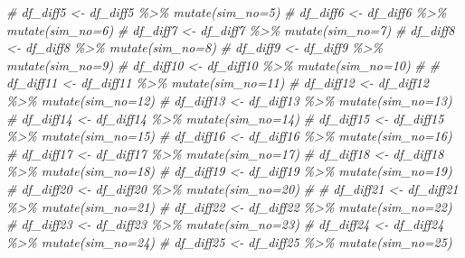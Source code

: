 \documentclass[
]{article}
\newenvironment{Shaded}{\begin{snugshade}}{\end{snugshade}}
\newcommand{\CommentTok}[1]{\textcolor[rgb]{0.56,0.35,0.01}{\textit{#1}}}
\begin{document}
\begin{Shaded}
\begin{Highlighting}[]
\CommentTok{\# df\_diff5 \textless{}{-} df\_diff5 \%\textgreater{}\% mutate(sim\_no=\textquotesingle{}5\textquotesingle{})}
\CommentTok{\# df\_diff6 \textless{}{-} df\_diff6 \%\textgreater{}\% mutate(sim\_no=\textquotesingle{}6\textquotesingle{})}
\CommentTok{\# df\_diff7 \textless{}{-} df\_diff7 \%\textgreater{}\% mutate(sim\_no=\textquotesingle{}7\textquotesingle{})}
\CommentTok{\# df\_diff8 \textless{}{-} df\_diff8 \%\textgreater{}\% mutate(sim\_no=\textquotesingle{}8\textquotesingle{})}
\CommentTok{\# df\_diff9 \textless{}{-} df\_diff9 \%\textgreater{}\% mutate(sim\_no=\textquotesingle{}9\textquotesingle{})}
\CommentTok{\# df\_diff10 \textless{}{-} df\_diff10 \%\textgreater{}\% mutate(sim\_no=\textquotesingle{}10\textquotesingle{})}
\CommentTok{\# }
\CommentTok{\# df\_diff11 \textless{}{-} df\_diff11 \%\textgreater{}\% mutate(sim\_no=\textquotesingle{}11\textquotesingle{})}
\CommentTok{\# df\_diff12 \textless{}{-} df\_diff12 \%\textgreater{}\% mutate(sim\_no=\textquotesingle{}12\textquotesingle{})}
\CommentTok{\# df\_diff13 \textless{}{-} df\_diff13 \%\textgreater{}\% mutate(sim\_no=\textquotesingle{}13\textquotesingle{})}
\CommentTok{\# df\_diff14 \textless{}{-} df\_diff14 \%\textgreater{}\% mutate(sim\_no=\textquotesingle{}14\textquotesingle{})}
\CommentTok{\# df\_diff15 \textless{}{-} df\_diff15 \%\textgreater{}\% mutate(sim\_no=\textquotesingle{}15\textquotesingle{})}
\CommentTok{\# df\_diff16 \textless{}{-} df\_diff16 \%\textgreater{}\% mutate(sim\_no=\textquotesingle{}16\textquotesingle{})}
\CommentTok{\# df\_diff17 \textless{}{-} df\_diff17 \%\textgreater{}\% mutate(sim\_no=\textquotesingle{}17\textquotesingle{})}
\CommentTok{\# df\_diff18 \textless{}{-} df\_diff18 \%\textgreater{}\% mutate(sim\_no=\textquotesingle{}18\textquotesingle{})}
\CommentTok{\# df\_diff19 \textless{}{-} df\_diff19 \%\textgreater{}\% mutate(sim\_no=\textquotesingle{}19\textquotesingle{})}
\CommentTok{\# df\_diff20 \textless{}{-} df\_diff20 \%\textgreater{}\% mutate(sim\_no=\textquotesingle{}20\textquotesingle{})}
\CommentTok{\# }
\CommentTok{\# df\_diff21 \textless{}{-} df\_diff21 \%\textgreater{}\% mutate(sim\_no=\textquotesingle{}21\textquotesingle{})}
\CommentTok{\# df\_diff22 \textless{}{-} df\_diff22 \%\textgreater{}\% mutate(sim\_no=\textquotesingle{}22\textquotesingle{})}
\CommentTok{\# df\_diff23 \textless{}{-} df\_diff23 \%\textgreater{}\% mutate(sim\_no=\textquotesingle{}23\textquotesingle{})}
\CommentTok{\# df\_diff24 \textless{}{-} df\_diff24 \%\textgreater{}\% mutate(sim\_no=\textquotesingle{}24\textquotesingle{})}
\CommentTok{\# df\_diff25 \textless{}{-} df\_diff25 \%\textgreater{}\% mutate(sim\_no=\textquotesingle{}25\textquotesingle{})}

\end{Highlighting}
\end{Shaded}
\end{document}

